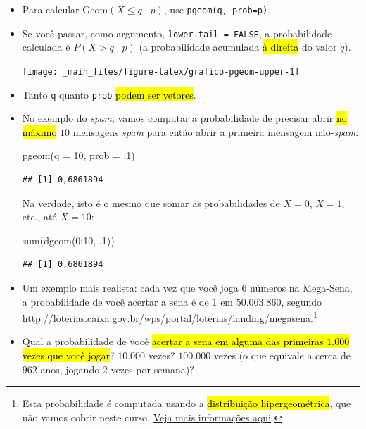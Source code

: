 \documentclass[
  11pt]{report}
\newenvironment{Shaded}{\begin{snugshade}}{\end{snugshade}}
\newcommand{\AttributeTok}[1]{\textcolor[rgb]{0.77,0.63,0.00}{#1}}
\newcommand{\DecValTok}[1]{\textcolor[rgb]{0.00,0.00,0.81}{#1}}
\newcommand{\FunctionTok}[1]{\textcolor[rgb]{0.00,0.00,0.00}{#1}}
\newcommand{\NormalTok}[1]{#1}
\newcommand{\SpecialCharTok}[1]{\textcolor[rgb]{0.00,0.00,0.00}{#1}}
\renewenvironment{Shaded}{
    \begin{mdframed}[%
      roundcorner=2pt,%
      innerleftmargin=5pt,%
      innerrightmargin=5pt,%
      topline=true,%
      leftline=true,%
      rightline=true,%
      bottomline=true,%
      linewidth=0.5pt,%
      linecolor=black!20,%
      backgroundcolor=black!2,%
      skipabove=2ex,%
      skipbelow=2.5ex%
    ]%
  }
  {
    \end{mdframed}
  }
\begin{document}
\begin{itemize}
\item
  Para calcular $\text{Geom}(X \leq q \mid p)$, use \texttt{pgeom(q,\ prob=p)}.
\item
  Se você passar, como argumento, \texttt{lower.tail\ =\ FALSE}, a probabilidade calculada é $P(X > q \mid p)$ (a probabilidade acumulada {\hl{à direita}} do valor $q$).

  \begin{center}\texttt{[image: \_main\_files/figure-latex/grafico-pgeom-upper-1]} \end{center}
\item
  Tanto \texttt{q} quanto \texttt{prob} {\hl{podem ser vetores}}.
\item
  No exemplo do \emph{spam}, vamos computar a probabilidade de precisar abrir {\hl{no máximo}} $10$ mensagens \emph{spam} para então abrir a primeira mensagem não-\emph{spam}:

\begin{Shaded}
\begin{Highlighting}[]
\FunctionTok{pgeom}\NormalTok{(}\AttributeTok{q =} \DecValTok{10}\NormalTok{, }\AttributeTok{prob =}\NormalTok{ .}\DecValTok{1}\NormalTok{)}
\end{Highlighting}
\end{Shaded}

\begin{verbatim}
## [1] 0,6861894
\end{verbatim}

  Na verdade, isto é o mesmo que somar as probabilidades de $X = 0$, $X = 1$, etc., até $X = 10$:

\begin{Shaded}
\begin{Highlighting}[]
\FunctionTok{sum}\NormalTok{(}\FunctionTok{dgeom}\NormalTok{(}\DecValTok{0}\SpecialCharTok{:}\DecValTok{10}\NormalTok{, .}\DecValTok{1}\NormalTok{))}
\end{Highlighting}
\end{Shaded}

\begin{verbatim}
## [1] 0,6861894
\end{verbatim}
\item
  Um exemplo mais realista: cada vez que você joga $6$ números na Mega-Sena, a probabilidade de você acertar a sena é de $1$ em $50.063.860$, segundo \url{http://loterias.caixa.gov.br/wps/portal/loterias/landing/megasena}.\footnote{Esta probabilidade é computada usando a {\hl{distribuição hipergeométrica}}, que não vamos cobrir neste curso. \href{https://pt.wikipedia.org/wiki/Distribui\%C3\%A7\%C3\%A3o_hipergeom\%C3\%A9trica}{Veja mais informações aqui}.}
\item
  Qual a probabilidade de você {\hl{acertar a sena em alguma das primeiras $1.000$ vezes que você jogar}}? $10.000$ vezes? $100.000$ vezes (o que equivale a cerca de $962$ anos, jogando $2$ vezes por semana)?


\end{itemize}
\end{document}
